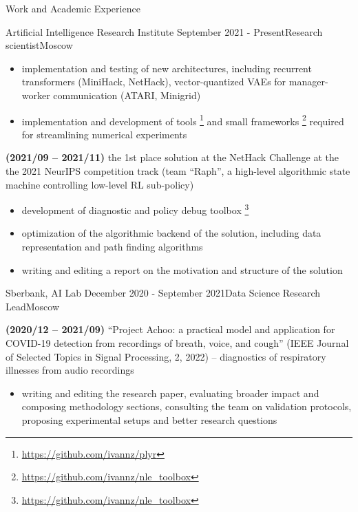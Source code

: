 \documentclass{resume} %
\begin{document}
\begin{rSection}{Work and Academic Experience}
\begin{rSubsection}{
        Artificial Intelligence Research Institute
    }{September 2021 - Present}{Research scientist}{Moscow}
\begin{itemize}
        \item implementation and testing of new architectures, including recurrent transformers (MiniHack, NetHack), vector-quantized VAEs for manager-worker communication (ATARI, Minigrid)
        
        \item implementation and development of tools%
        \footnote{
            \url{https://github.com/ivannz/plyr}
        }
        and small frameworks%
        \footnote{
            \url{https://github.com/ivannz/nle_toolbox}
        }
        required for streamlining numerical experiments
    \end{itemize}

    \item \textbf{(2021/09 -- 2021/11)}
    the 1st place solution at the NetHack Challenge at the the 2021 NeurIPS competition track (team ``Raph'', a high-level algorithmic state machine controlling low-level RL sub-policy)
    \begin{itemize}
        \item development of diagnostic and policy debug toolbox%
        \footnote{
            \url{https://github.com/ivannz/nle_toolbox}
        }

        \item optimization of the algorithmic backend of the solution, including data representation and path finding algorithms

        \item writing and editing a report on the motivation and structure of the solution
    \end{itemize}
\end{rSubsection}

\begin{rSubsection}{
        Sberbank, AI Lab
    }{December 2020 - September 2021}{Data Science Research Lead}{Moscow}

    \item \textbf{(2020/12 -- 2021/09)}
    ``Project Achoo: a practical model and application for COVID-19 detection from recordings of breath, voice, and cough'' (IEEE Journal of Selected Topics in Signal Processing, 2, 2022) -- diagnostics of respiratory illnesses from audio recordings

    \begin{itemize}
        \item writing and editing the research paper, evaluating broader impact and composing methodology sections, consulting the team on validation protocols, proposing experimental setups and better research questions


\end{itemize}
\end{rSubsection}
\end{rSection}
\end{document}
